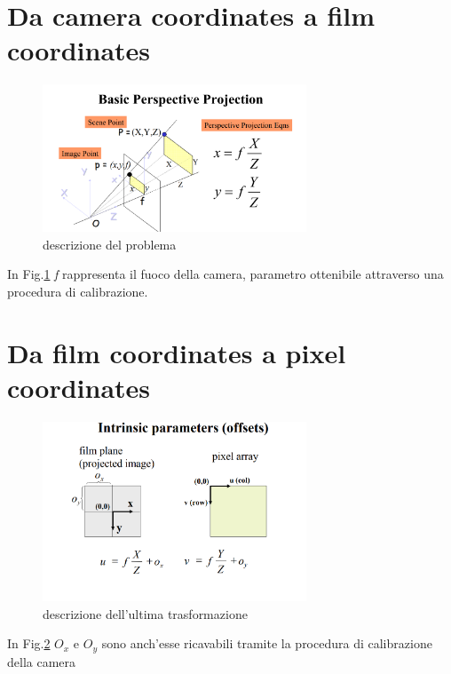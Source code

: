 \section{Da camera coordinates a film coordinates}
\begin{figure}[H]
	\centering
	\includegraphics[width=0.7\textwidth]{Immagini/perspective_projection.png}
	\caption{descrizione del problema}
	\label{fig:perspective_projection}
\end{figure}
In Fig.\ref{fig:perspective_projection} \textit{f} rappresenta il fuoco della camera, parametro ottenibile attraverso una procedura di calibrazione.

\section{Da film coordinates a pixel coordinates}

\begin{figure}[H]
	\centering
	\includegraphics[width=0.7\textwidth]{Immagini/intrinsic_parameters.png}
	\caption{descrizione dell'ultima trasformazione}
	\label{fig:intrinsic_parameters}
\end{figure}
In Fig.\ref{fig:intrinsic_parameters} $ O_{x}$ e $ O_{y} $ sono anch'esse ricavabili tramite la procedura di calibrazione della camera

